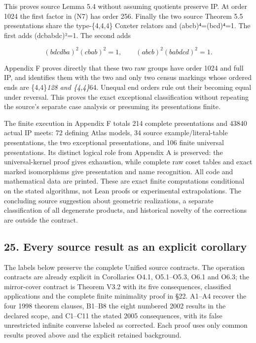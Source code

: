 \documentclass[
  10pt,
  letterpaper,
]{article}
\begin{document}
This proves source Lemma 5.4 without assuming quotients preserve IP. At
order 1024 the first factor in (N7) has order 256. Finally the two
source Theorem 5.5 presentations share the type-\{4,4,4\} Coxeter
relators and (abcb)⁴=(bcd)⁴=1. The first adds (dcbabdc)²=1. The second
adds

\[
(bdcdba)^2(cbab)^2=1,\qquad(abcb)^2(babdcd)^2=1.
\tag{N8}
\]

Appendix F proves directly that these two raw groups have order 1024 and
full IP, and identifies them with the two and only two census markings
whose ordered ends are \{4,4\}\emph{128 and \{4,4\}}64. Unequal end
orders rule out their becoming equal under reversal. This proves the
exact exceptional classification without repeating the source's separate
case analysis or presuming its presentations finite.

The finite execution in Appendix F totals 214 complete presentations and
43840 actual IP meets: 72 defining Atlas models, 34 source
example/literal-table presentations, the two exceptional presentations,
and 106 finite universal presentations. Its distinct logical role from
Appendix A is preserved: the universal-kernel proof gives exhaustion,
while complete raw coset tables and exact marked isomorphisms give
presentation and name recognition. All code and mathematical data are
printed. These are exact finite computations conditional on the stated
algorithms, not Lean proofs or experimental extrapolations. The
concluding source suggestion about geometric realizations, a separate
classification of all degenerate products, and historical novelty of the
corrections are outside the contract.

\subsection{25. Every source result as an explicit
corollary}\label{every-source-result-as-an-explicit-corollary}

The labels below preserve the complete Unified source contracts. The
operation contracts are already explicit in Corollaries O4.1,
O5.1--O5.3, O6.1 and O6.3; the mirror-cover contract is Theorem V3.2
with its five consequences, classified applications and the complete
finite minimality proof in §22. A1--A4 recover the four 1998 theorem
clauses, B1--B8 the eight numbered 2002 results in the declared scope,
and C1--C11 the stated 2005 consequences, with its false unrestricted
infinite converse labeled as corrected. Each proof uses only common
results proved above and the explicit retained background.
\end{document}
